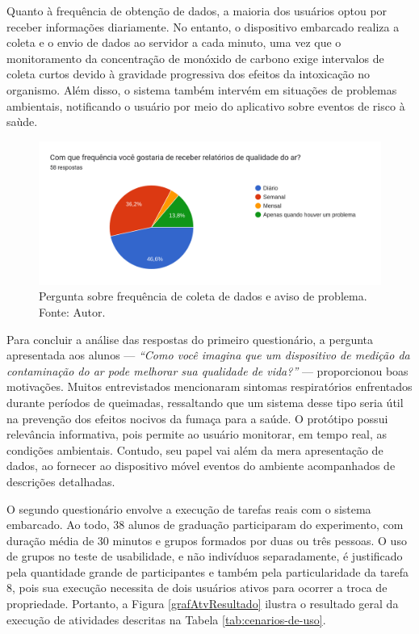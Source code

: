 Quanto à frequência de obtenção de dados, a maioria dos usuários optou por receber informações diariamente. No entanto, o dispositivo embarcado realiza a coleta e o envio de dados ao servidor a cada minuto, uma vez 
que o monitoramento da concentração de monóxido de carbono exige intervalos de coleta curtos devido à gravidade progressiva dos efeitos da intoxicação no organismo. Além disso, o sistema também intervém em situações 
de problemas ambientais, notificando o usuário por meio do aplicativo sobre eventos de risco à saùde.
\begin{figure}[ht]
    \centering
    \includegraphics[width=.64\textwidth]{img/questionario/1/graf-info-frequencia.png}
    \caption{Pergunta sobre frequência de coleta de dados e aviso de problema. Fonte: Autor.}\label{grafFrequenciaInfo}
\end{figure}

Para concluir a análise das respostas do primeiro questionário, a pergunta apresentada aos alunos — \textit{``Como você imagina que um dispositivo de medição da contaminação do ar pode melhorar sua qualidade de vida?''} — proporcionou boas motivações. Muitos 
entrevistados mencionaram sintomas respiratórios enfrentados durante períodos de queimadas, ressaltando que um sistema desse tipo seria útil na prevenção dos efeitos nocivos da fumaça para a saúde. O protótipo possui 
relevância informativa, pois permite ao usuário monitorar, em tempo real, as condições ambientais. Contudo, seu papel vai além da mera apresentação de dados, ao fornecer ao dispositivo móvel eventos do ambiente 
acompanhados de descrições detalhadas.

O segundo questionário envolve a execução de tarefas reais com o sistema embarcado. Ao todo, 38 alunos de graduação participaram 
do experimento, com duração média de 30 minutos e grupos formados por duas ou três pessoas. O uso de grupos no teste de usabilidade, e não indivíduos separadamente, é justificado 
pela quantidade grande de participantes e também pela particularidade da tarefa 8, pois sua execução necessita de dois usuários ativos para ocorrer a troca de propriedade. Portanto, 
a Figura \ref{grafAtvResultado} ilustra o resultado geral da execução de atividades descritas na Tabela \ref{tab:cenarios-de-uso}. 

